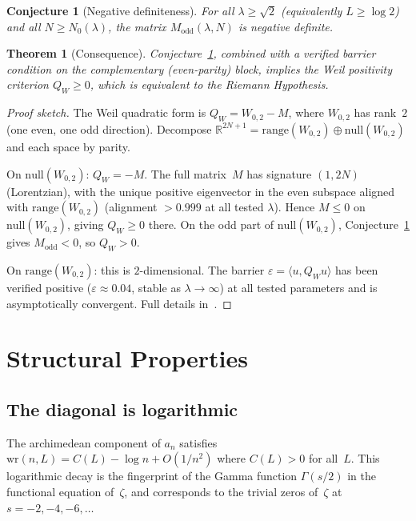 \documentclass[11pt,a4paper]{article}
\newtheorem{theorem}{Theorem}
\newtheorem{conjecture}{Conjecture}
\begin{document}
\begin{conjecture}[Negative definiteness]\label{conj:main}
For all $\lambda \geq \sqrt{2}$ (equivalently $L \geq \log 2$) and all $N \geq N_0(\lambda)$, the matrix $M_{\mathrm{odd}}(\lambda, N)$ is negative definite.
\end{conjecture}

\begin{theorem}[Consequence]\label{thm:consequence}
Conjecture~\ref{conj:main}, combined with a verified barrier condition on the complementary (even-parity) block, implies the Weil positivity criterion $Q_W \geq 0$, which is equivalent to the Riemann Hypothesis.
\end{theorem}

\begin{proof}[Proof sketch]
The Weil quadratic form is $Q_W = W_{0,2} - M$, where $W_{0,2}$ has rank~$2$ (one even, one odd direction). Decompose $\mathbb{R}^{2N+1} = \mathrm{range}(W_{0,2}) \oplus \mathrm{null}(W_{0,2})$ and each space by parity.

On $\mathrm{null}(W_{0,2})$: $Q_W = -M$. The full matrix~$M$ has signature $(1, 2N)$ (Lorentzian), with the unique positive eigenvector in the even subspace aligned with $\mathrm{range}(W_{0,2})$ (alignment $> 0.999$ at all tested $\lambda$). Hence $M \leq 0$ on $\mathrm{null}(W_{0,2})$, giving $Q_W \geq 0$ there. On the odd part of $\mathrm{null}(W_{0,2})$, Conjecture~\ref{conj:main} gives $M_{\mathrm{odd}} < 0$, so $Q_W > 0$.

On $\mathrm{range}(W_{0,2})$: this is $2$-dimensional. The barrier $\varepsilon = \langle u, Q_W u \rangle$ has been verified positive ($\varepsilon \approx 0.04$, stable as $\lambda \to \infty$) at all tested parameters and is asymptotically convergent. Full details in~\cite{Vaughan2026}.
\end{proof}

\section{Structural Properties}

\subsection{The diagonal is logarithmic}

The archimedean component of $a_n$ satisfies $\mathrm{wr}(n, L) = C(L) - \log n + O(1/n^2)$ where $C(L) > 0$ for all~$L$. This logarithmic decay is the fingerprint of the Gamma function $\Gamma(s/2)$ in the functional equation of~$\zeta$, and corresponds to the trivial zeros of~$\zeta$ at $s = -2, -4, -6, \ldots$
\end{document}
